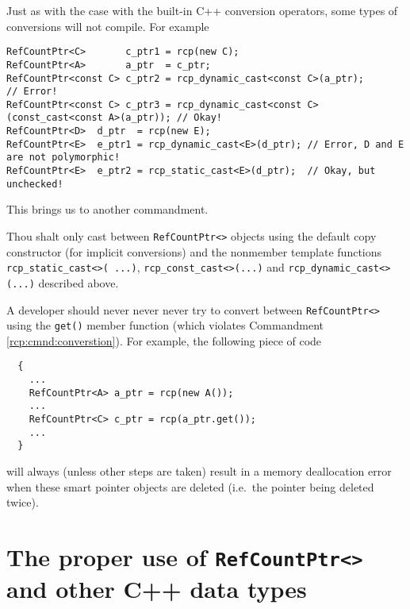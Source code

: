 Just as with the case with the built-in C++ conversion operators, some
types of conversions will not compile.  For example

{\scriptsize\begin{verbatim}
RefCountPtr<C>       c_ptr1 = rcp(new C);
RefCountPtr<A>       a_ptr  = c_ptr;
RefCountPtr<const C> c_ptr2 = rcp_dynamic_cast<const C>(a_ptr);                      // Error!
RefCountPtr<const C> c_ptr3 = rcp_dynamic_cast<const C>(const_cast<const A>(a_ptr)); // Okay!
RefCountPtr<D>  d_ptr  = rcp(new E);
RefCountPtr<E>  e_ptr1 = rcp_dynamic_cast<E>(d_ptr); // Error, D and E are not polymorphic!
RefCountPtr<E>  e_ptr2 = rcp_static_cast<E>(d_ptr);  // Okay, but unchecked!
\end{verbatim}}

This brings us to another commandment.

\begin{commandment}\label{rcp:cmnd:converstion}
Thou shalt only cast between {}\texttt{RefCountPtr<>} objects using the
default copy constructor (for implicit conversions) and the nonmember
template functions {}\texttt{rcp\-\_static\-\_cast<>( ...)},
{}\texttt{rcp\-\_const\-\_cast<>(...)} and
{}\texttt{rcp\-\_dynamic\-\_cast<>(...)}  described above.
\end{commandment}

A developer should never never never try to convert between
{}\texttt{RefCountPtr<>} using the {}\texttt{get()} member function
(which violates Commandment {}\ref{rcp:cmnd:converstion}).  For
example, the following piece of code

{\scriptsize\begin{verbatim}
  {
    ...
    RefCountPtr<A> a_ptr = rcp(new A());
    ...
    RefCountPtr<C> c_ptr = rcp(a_ptr.get());
    ...
  }
\end{verbatim}}

{}\noindent{}will always (unless other steps are taken) result in a
memory deallocation error when these smart pointer objects are deleted
(i.e.~the pointer being deleted twice).

%
\section{The proper use of {}\texttt{RefCountPtr<>} and other C++ data types}
%

